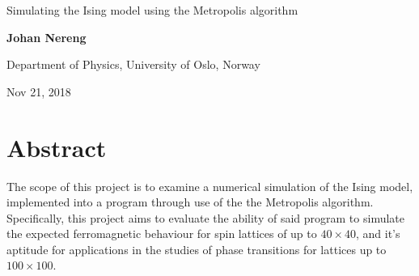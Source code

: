 \documentclass[%
oneside,                 %
final,                   %
10pt]{article}
\begin{document}

\newcommand{\exercisesection}[1]{\subsection*{#1}}






\thispagestyle{empty}

\begin{center}
{\LARGE\bf
\begin{spacing}{1.25}
Simulating the Ising model using the Metropolis algorithm
\end{spacing}
}
\end{center}


\begin{center}
{\bf Johan Nereng}
\end{center}

    \begin{center}
\centerline{{\small Department of Physics, University of Oslo, Norway}}
\end{center}
    

\begin{center}
Nov 21, 2018
\end{center}

\vspace{1cm}


\section{Abstract}
The scope of this project is to examine a numerical simulation of the Ising model, implemented into a program through use of the the Metropolis algorithm. Specifically, this project aims to evaluate the ability of said program to simulate the expected ferromagnetic behaviour for spin lattices of up to $40 \times 40$, and it's aptitude for applications in the studies of phase transitions for lattices up to $100 \times 100$. \newline
\end{document}

